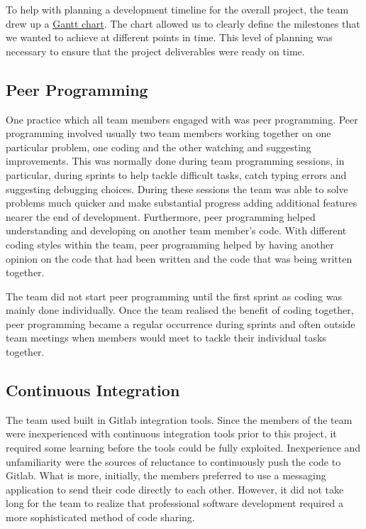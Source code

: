 \documentclass{l3proj}
\begin{document}


To help with planning a development timeline for the overall project, the team drew up a \hyperref[fig:gantt]{Gantt chart}. The chart allowed us to clearly define the milestones that we wanted to achieve at different points in time. This level of planning was necessary to ensure that the project deliverables were ready on time.



\subsection{Peer Programming}
One practice which all team members engaged with was peer programming. Peer programming involved usually two team members working together on one particular problem, one coding and the other watching and suggesting improvements. This was normally done during team programming sessions, in particular, during sprints to help tackle difficult tasks, catch typing errors and suggesting debugging choices. During these sessions the team was able to solve problems much quicker and make substantial progress adding additional features nearer the end of development. Furthermore, peer programming helped understanding and developing on another team member's code. With different coding styles within the team, peer programming helped by having another opinion on the code that had been written and the code that was being written together. 

The team did not start peer programming until the first sprint as coding was mainly done individually. Once the team realised the benefit of coding together, peer programming became a regular occurrence during sprints and often outside team meetings when members would meet to tackle their individual tasks together.

\subsection{Continuous Integration}
The team used built in Gitlab integration tools. Since the members of the team were inexperienced with continuous integration tools prior to this project, it required some learning before the tools could be fully exploited. Inexperience and unfamiliarity were the sources of reluctance to continuously push the code to Gitlab. What is more, initially, the members preferred to use a messaging application to send their code directly to each other. However, it did not take long for the team to realize that professional software development required a more sophisticated method of code sharing.
\end{document}
